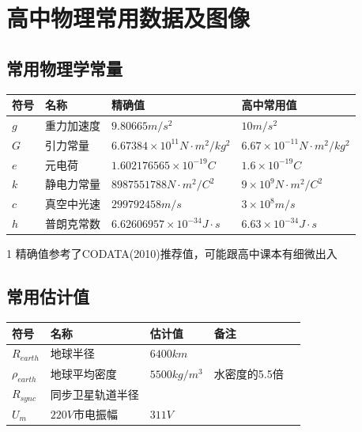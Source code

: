 
\chapter{高中物理常用数据及图像}

\section{常用物理学常量}

\begin{table}[h]
\centering
\begin{threeparttable}
\begin{tabular}{l|l|l|l}
\textbf{符号} & \textbf{名称} & \textbf{精确值}\tnote{1} & \textbf{高中常用值}\\
\hline
$g$ & 重力加速度 & $9.80665 m/s^2$ & $10m/s^2$ \\
$G$ & 引力常量 & $6.67384 \times 10^{11} N \cdot m^2/kg^2$ & $6.67 \times 10^{-11} N \cdot m^2/kg^2$ \\
$e$ & 元电荷 & $1.602176565 \times 10^{-19} C$ & $1.6 \times 10^{-19} C$ \\ 
$k$ &  静电力常量 & $8987551788 N \cdot m^2 / C^2$ & $9 \times 10^{9} N \cdot m^2 /C^2$ \\
$c$ & 真空中光速 & $299792458 m/s$ & $3 \times 10^{8} m/s$ \\
$h$ & 普朗克常数 & $6.62606957 \times 10^{-34} J \cdot s$ & $6.63 \times 10^{-34} J \cdot s$ \\
\hline
\end{tabular}
\begin{tablenotes}
\item[1] 精确值参考了CODATA(2010)推荐值，可能跟高中课本有细微出入
\end{tablenotes}
\end{threeparttable}
\end{table}

\section{常用估计值}

\begin{center}
\begin{tabular}{l|l|l|l|l}
\textbf{符号} & \textbf{名称} & \textbf{估计值} & \textbf{备注} \\
\hline
$R_{earth}$ & 地球半径  & $6400 km$  & \\
$\rho_{earth}$ & 地球平均密度 & $5500 kg/m^3$ & 水密度的5.5倍 \\
$R_{sync}$ & 同步卫星轨道半径  &  & \\
$U_{m}$ & $220V$市电振幅 & $311 V$ & \\
\hline
\end{tabular}
\end{center}


